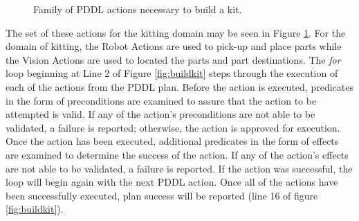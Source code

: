 %
\begin{figure}[htb!]
\caption{Family of PDDL actions necessary to build a kit.}
\label{fig:PDDLActions}
\end{figure}

The set of these actions for the kitting domain may be seen in
Figure \ref{fig:PDDLActions}. For the domain of kitting,
the Robot Actions are used to
pick-up and place parts while the Vision Actions are used to
located the parts and part destinations. The
{\it for} loop beginning at Line 2 of Figure \ref{fig:buildkit} steps
through the execution of each of the actions from the PDDL plan. 
Before the action is
executed, predicates in the form of
preconditions are examined to assure that the action 
to be attempted
is valid. If any of the action's preconditions are not able to 
be validated,
a failure is reported; otherwise, the action is approved for execution.
Once the action has been executed, additional predicates in the form
of effects are examined to determine the success of the action.
If any of the action's effects are not able to be validated, a 
failure is reported. If the action was successful, the loop will
begin again with the next PDDL action. Once all of the actions have
been successfully executed, plan success will be reported (line 16 of
figure \ref{fig:buildkit}).

